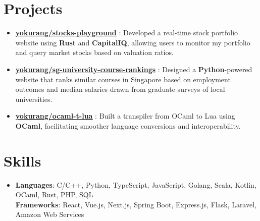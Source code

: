 \documentclass[letterpaper,10pt]{article}
\newcommand{\ulhref}[2]{\href{#1}{\underline{#2}}}
\newcommand{\resumeItem}[2]{
  \item\small{
    \textbf{#1}{: #2 \vspace{-2pt}}
  }
}
\newcommand{\resumeSubItem}[2]{\resumeItem{#1}{#2}\vspace{-4pt}}
\newcommand{\resumeSubHeadingListStart}{\begin{itemize}[leftmargin=*, label={}]}
\newcommand{\resumeSubHeadingListEnd}{\end{itemize}}
\begin{document}
 \section{Projects}
  \resumeSubHeadingListStart
    \resumeSubItem{
    	\ulhref{https://github.com/yokurang/stocks-playground}{yokurang/stocks-playground}
    }
    {Developed a real-time stock portfolio website using \textbf{Rust} and \textbf{CapitalIQ}, allowing users to monitor my portfolio and query market stocks based on valuation ratios.}
    \resumeSubItem{
    	\ulhref{https://github.com/yokurang/sg-university-course-rankings}{yokurang/sg-university-course-rankings}
    }
      {Designed a \textbf{Python}-powered website that ranks similar courses in Singapore based on employment outcomes and median salaries drawn from graduate surveys of local universities.}
    \resumeSubItem{
		\ulhref{https://github.com/yokurang/ocaml-t-lua}{yokurang/ocaml-t-lua}
    }
    {Built a transpiler from OCaml to Lua using \textbf{OCaml}, facilitating smoother language conversions and interoperability.}
  \resumeSubHeadingListEnd

\section{Skills}
 \resumeSubHeadingListStart
   \item{
	\textbf
     {Languages}{: C/C++, Python, TypeScript, JavaScript, Golang, Scala, Kotlin, OCaml,
     Rust, PHP, SQL}
	\\
	\textbf{Frameworks}{: React, Vue.js, Next.js, Spring Boot, Express.js, Flask, Laravel, Amazon Web Services }
   }
 \resumeSubHeadingListEnd

\end{document}
